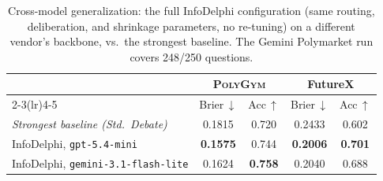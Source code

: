 \begin{table}[t]
\centering
\small
\caption{Cross-model generalization: the full InfoDelphi configuration
(same routing, deliberation, and shrinkage parameters, no re-tuning) on a
different vendor's backbone, vs.\ the strongest baseline. The Gemini
Polymarket run covers 248/250 questions.}
\label{tab:crossmodel}
\begin{tabular}{lcccc}
\toprule
 & \multicolumn{2}{c}{\textsc{PolyGym}} & \multicolumn{2}{c}{FutureX} \\
\cmidrule(lr){2-3}\cmidrule(lr){4-5}
 & Brier$\,\downarrow$ & Acc$\,\uparrow$ & Brier$\,\downarrow$ & Acc$\,\uparrow$ \\
\midrule
\textit{Strongest baseline (Std.\ Debate)} & 0.1815 & 0.720 & 0.2433 & 0.602 \\
\midrule
InfoDelphi, \texttt{gpt-5.4-mini} & \textbf{0.1575} & 0.744 & \textbf{0.2006} & \textbf{0.701} \\
InfoDelphi, \texttt{gemini-3.1-flash-lite} & 0.1624 & \textbf{0.758} & 0.2040 & 0.688 \\
\bottomrule
\end{tabular}
\end{table}
